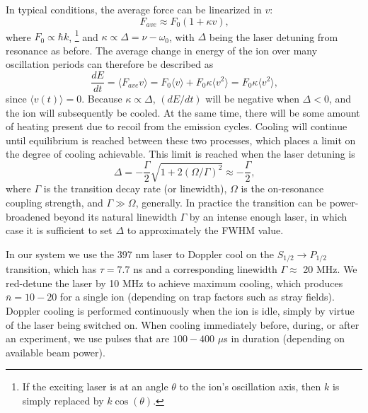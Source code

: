 In typical conditions, the average force can be linearized in $v$:
\begin{equation}
F_{ave} \approx F_0 (1 + \kappa v) \text{,}
\end{equation}
where $F_0 \propto \hbar k$, \footnote{If the exciting laser is at an angle $\theta$ to the ion's oscillation axis, then $k$ is simply replaced by $k \cos (\theta)$.} and $\kappa \propto \Delta = \nu - \omega_0$, with $\Delta$ being the laser detuning from resonance as before. The average change in energy of the ion over many oscillation periods can therefore be described as
\begin{equation}
\frac{d E}{d t} = \langle F_{ave} v \rangle = F_0 \langle v \rangle + F_0 \kappa \langle v^2 \rangle = F_0 \kappa \langle v^2 \rangle \text{,}
\end{equation}
since $\langle v(t) \rangle = 0$. Because $\kappa \propto \Delta$, $( d E / d t )$ will be negative when $\Delta < 0$, and the ion will subsequently be cooled. At the same time, there will be some amount of heating present due to recoil from the emission cycles. Cooling will continue until equilibrium is reached between these two processes, which places a limit on the degree of cooling achievable. This limit is reached when the laser detuning is
\begin{equation}
\Delta = - \frac{\Gamma}{2} \sqrt{1 + 2 (\Omega / \Gamma)^2} \approx - \frac{\Gamma}{2} \text{,}
\end{equation}
where $\Gamma$ is the transition decay rate (or linewidth), $\Omega$ is the on-resonance coupling strength, and $\Gamma \gg \Omega$, generally. In practice the transition can be power-broadened beyond its natural linewidth $\Gamma$ by an intense enough laser, in which case it is sufficient to set $\Delta$ to approximately the FWHM value.

In our system we use the 397 nm laser to Doppler cool on the $S_{1/2} \rightarrow P_{1/2}$ transition, which has $\tau = 7.7$ ns and a corresponding linewidth $\Gamma \approx$ 20 MHz. We red-detune the laser by 10 MHz to achieve maximum cooling, which produces $\bar{n} = 10-20$ for a single ion (depending on trap factors such as stray fields). Doppler cooling is performed continuously when the ion is idle, simply by virtue of the laser being switched on. When cooling immediately before, during, or after an experiment, we use pulses that are $100 - 400$ $\mu$s in duration (depending on available beam power).   

